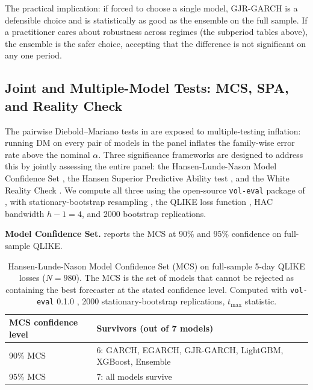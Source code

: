The practical implication: if forced to choose a single model, GJR-GARCH is a defensible choice and is statistically as good as the ensemble on the full sample. If a practitioner cares about robustness across regimes (the subperiod tables above), the ensemble is the safer choice, accepting that the difference is not significant on any one period.

\subsection{Joint and Multiple-Model Tests: MCS, SPA, and Reality Check}\label{sec:mcs_spa}

The pairwise Diebold--Mariano tests in  are exposed to multiple-testing inflation: running DM on every pair of models in the panel inflates the family-wise error rate above the nominal $\alpha$. Three significance frameworks are designed to address this by jointly assessing the entire panel: the Hansen-Lunde-Nason Model Confidence Set \citep{HansenLundeNason2011}, the Hansen Superior Predictive Ability test \citep{Hansen2005}, and the White Reality Check \citep{White2000}. We compute all three using the open-source \texttt{vol-eval} package of \citet{Khan2026VolEval}, with stationary-bootstrap resampling \citep{PolitisRomano1994}, the QLIKE loss function \citep{Patton2011}, HAC bandwidth $h-1=4$, and 2000 bootstrap replications.

\textbf{Model Confidence Set.}  reports the MCS at 90\% and 95\% confidence on full-sample QLIKE.

\begin{table}[H]
\centering
\small
\caption{Hansen-Lunde-Nason Model Confidence Set (MCS) on full-sample 5-day QLIKE losses ($N=980$). The MCS is the set of models that cannot be rejected as containing the best forecaster at the stated confidence level. Computed with \texttt{vol-eval} 0.1.0 \citep{Khan2026VolEval}, 2000 stationary-bootstrap replications, $t_{\max}$ statistic.}
\label{tab:mcs_results}
\begin{tabular}{l p{9.5cm}}
\toprule
\textbf{MCS confidence level} & \textbf{Survivors (out of 7 models)} \\
\midrule
90\% MCS & 6: GARCH, EGARCH, GJR-GARCH, LightGBM, XGBoost, Ensemble \\
95\% MCS & 7: all models survive \\
\bottomrule
\end{tabular}
\end{table}

